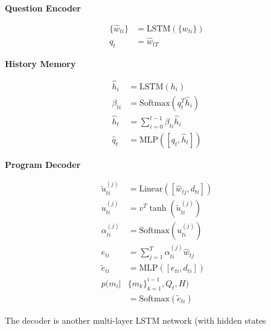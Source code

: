 \documentclass[runningheads]{llncs}
\begin{document}
\small
\begin{multicols}{2}
\begin{center}\textbf{Question Encoder}\end{center}
\vspace*{-10pt}
\begin{align}
	\{\hat{w}_{ti}\} &= \text{LSTM}(\{w_{ti}\})
						\label{eq:ques-enc-1}\\
	q_t &= \hat{w}_{tT} \nonumber
\end{align}

\begin{center}\textbf{History Memory}\end{center}
\vspace*{-10pt}
\begin{align}
	\hat{h}_i &= \text{LSTM}(h_i)
    					\label{eq:hist-mem-1}\\
    \beta_{ti} &= \text{Softmax}(q_t^T \hat{h}_i)
    					\nonumber\\
    \hat{h}_t &= \sum_{i=0}^{t-1} \beta_{ti} \hat{h}_i
    					\label{eq:hist-mem-2}\\
	\hat{q}_t &= \text{MLP}([q_t, \hat{h}_t])
    						\label{eq:prog-dec-1}           
\end{align} 
\vspace*{-20pt}
\columnbreak
\vspace*{-20pt}
\begin{center}\textbf{Program Decoder}\end{center}
\vspace*{-30pt}
\begin{align}
    \tilde u_{ti}^{(j)} &= \text{Linear}([\hat{w}_{tj}, d_{ti}])
    						\nonumber\\
    u_{ti}^{(j)} &= v^T \tanh(\tilde u_{ti}^{(j)})
    						\nonumber\\
    \alpha_{ti}^{(j)} &= \text{Softmax}(u_{ti}^{(j)})
    						\nonumber\\
    e_{ti} &= \sum_{j=1}^T \alpha_{ti}^{(j)} \hat{w}_{tj} 
							\label{eq:prog-dec-5}\\
    \tilde e_{ti} &= \text{MLP}([e_{ti}, d_{ti}]) 
							\label{eq:prog-dec-6}\\
    p(m_i | &\{m_k\}_{k=1}^{i-1}, Q_t, H) 
    						\nonumber\\
    	&= \text{Softmax}(\tilde e_{ti}) 
        					\label{eq:prog-dec-7}
\end{align} 
\end{multicols}
\normalsize 
The decoder is another multi-layer LSTM network (with hidden states 
\end{document}

